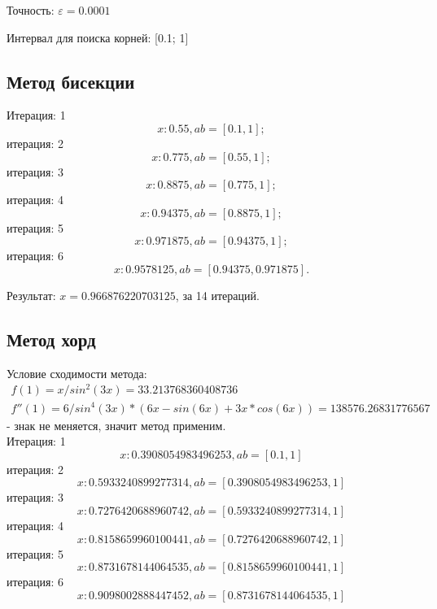 \documentclass{article}
\begin{document}
Точность: $\varepsilon = 0.0001$

Интервал для поиска корней: [0.1; 1]

\subsection{Метод бисекции}

Итерация: 1
\begin{displaymath}
  x: 0.55, ab = [0.1, 1];
\end{displaymath}
итерация: 2
\begin{displaymath}
  x: 0.775, ab = [0.55, 1];
\end{displaymath}
итерация: 3
\begin{displaymath}
  x: 0.8875, ab = [0.775, 1];
\end{displaymath}
итерация: 4
\begin{displaymath}
  x: 0.94375, ab = [0.8875, 1];
\end{displaymath}
итерация: 5
\begin{displaymath}
  x: 0.971875, ab = [0.94375, 1];
\end{displaymath}
итерация: 6
\begin{displaymath}
  x: 0.9578125, ab = [0.94375, 0.971875].
\end{displaymath}

Результат: $x = 0.966876220703125$, за 14 итераций.

\subsection{Метод хорд}
Условие сходимости метода: 
\begin{displaymath}
  \begin{array}{ccc}
    f(1) = x / sin^2(3x) = 33.213768360408736 \\
    f''(1) = 6/sin^4(3x) * (6x - sin(6x) + 3x * cos(6x)) = 138576.26831776567
  \end{array}
\end{displaymath}
- знак не меняется, значит метод применим.\\
Итерация: 1
\begin{displaymath} 
  x: 0.3908054983496253, ab = [0.1, 1]
\end{displaymath}
итерация: 2
\begin{displaymath}
  x: 0.5933240899277314, ab = [0.3908054983496253, 1]
\end{displaymath}
итерация: 3
\begin{displaymath}
  x: 0.7276420688960742, ab = [0.5933240899277314, 1]
\end{displaymath}
итерация: 4
\begin{displaymath}
  x: 0.8158659960100441, ab = [0.7276420688960742, 1]
\end{displaymath}
итерация: 5
\begin{displaymath}
  x: 0.8731678144064535, ab = [0.8158659960100441, 1]
\end{displaymath}
итерация: 6
\begin{displaymath}
  x: 0.9098002888447452, ab = [0.8731678144064535, 1]
\end{displaymath}
\end{document}
